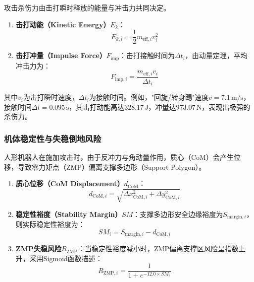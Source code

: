 \documentclass[a4paper,12pt]{article}
\numberwithin{equation}{section}
\numberwithin{table}{section}
\numberwithin{figure}{section}
\begin{document}
攻击杀伤力由击打瞬时释放的能量与冲击力共同决定。

\begin{enumerate}
    \item \textbf{击打动能（Kinetic Energy）}$E_k$：
    \begin{equation}
        E_{k, i} = \frac{1}{2} m_{\text{eff}, i} v_i^2
        \label{eq:ek}
    \end{equation}
    \item \textbf{击打冲量（Impulse Force）}$F_{\text{imp}}$：击打接触时间为$\Delta t_i$，由动量定理，平均冲击力为：
    \begin{equation}
        F_{\text{imp}, i} = \frac{m_{\text{eff}, i} v_i}{\Delta t_i}
        \label{eq:fimp}
    \end{equation}
\end{enumerate}
其中$v_i$为击打瞬时速度，$\Delta t_i$为接触时间。例如，"回旋/转身踢"速度$v = 7.1\,\text{m/s}$，接触时间$\Delta t = 0.095\,\text{s}$，其击打动能高达$328.17\,\text{J}$，冲量达$973.07\,\text{N}$，表现出极强的杀伤力。

\subsubsection{机体稳定性与失稳倒地风险}

人形机器人在施加攻击时，由于反冲力与角动量作用，质心（CoM）会产生位移，导致零力矩点（ZMP）偏离支撑多边形（Support Polygon）。

\begin{enumerate}
    \item \textbf{质心位移（CoM Displacement）}$d_{\text{CoM}}$：
    \begin{equation}
        d_{\text{CoM}, i} = \sqrt{\Delta x_{\text{CoM}, i}^2 + \Delta y_{\text{CoM}, i}^2}
        \label{eq:dcom}
    \end{equation}
    \item \textbf{稳定性裕度（Stability Margin）}$SM$：支撑多边形安全边缘裕度为$S_{\text{margin}, i}$，则实际稳定性裕度为：
    \begin{equation}
        SM_i = S_{\text{margin}, i} - d_{\text{CoM}, i}
        \label{eq:sm}
    \end{equation}
    \item \textbf{ZMP失稳风险}$R_{\text{ZMP}}$：当稳定性裕度减小时，ZMP偏离支撑区风险呈指数上升，采用Sigmoid函数描述：
    \begin{equation}
        R_{\text{ZMP}, i} = \frac{1}{1 + e^{-12.0 \times SM_i}}
        \label{eq:rzmp}
    \end{equation}
\end{enumerate}
\end{document}
